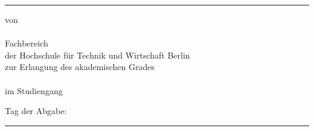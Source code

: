 {      \textcolor{HKS66}{\rule{\linewidth}{.4mm}}
      \begin{center}
        \begin{hsheadfont}
          \textcolor{\headcolor}{\LARGE \textbf{\thetitel}}
        \end{hsheadfont}
      \end{center}
      \begin{hsheadfont}
        \begin{center}
          \textbf{\Large{\thethesistyp}}
        \end{center}
      \end{hsheadfont}
      \begin{center}
        \begin{hsfont}
          von\\[2ex]
          {\textbf{\large\theautor}}\\[2ex]
          Fachbereich \thefachbereich\\
          der Hochschule für Technik und Wirtschaft Berlin\\[2ex]
          zur Erlangung des akademischen Grades\\
          \textbf{\theabschluss}\\
          im Studiengang\\
          \textbf{\thestudiengang}
        \end{hsfont}
      \end{center}
     
       \begin{center}
         Tag der Abgabe: \thedatum 
       \end{center}
         
      
      \thebetreuerFeld
      

      \textcolor{HKS66}{\rule{\linewidth}{0.4mm}}\\[1.5ex]
       \begin{hsheadfont}
         ~\hfill~
       \end{hsheadfont}
    }
    
